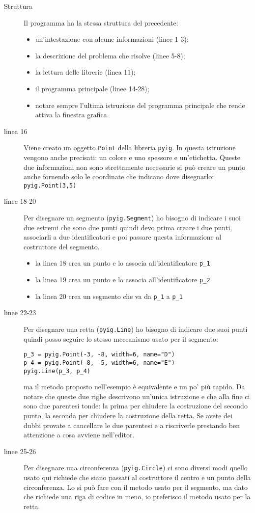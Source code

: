 \begin{description}
 \item [Struttura] 
 Il programma ha la stessa struttura del precedente:
\begin{itemize} [nosep]
 \item un'intestazione con alcune informazioni (linee 1-3); 
 \item la descrizione del problema che risolve (linee 5-8);
 \item la lettura delle librerie (linea 11);
 \item il programma principale (linee 14-28);
 \item notare sempre l'ultima istruzione del programma principale che rende 
attiva la finestra grafica.
\end{itemize}
 \item [linea 16]
 Viene creato un oggetto \lstinline{Point} della libreria \lstinline{pyig}. 
In questa istruzione vengono anche precisati: un colore e uno spessore e 
un'etichetta.
Queste due informazioni non sono strettamente necessarie si può creare un punto 
anche fornendo solo le coordinate che indicano dove disegnarlo:
\lstinline{pyig.Point(3,5)}
 \item [linee 18-20]
 Per disegnare un segmento (\lstinline{pyig.Segment}) ho bisogno di indicare i 
suoi due estremi che sono due punti quindi devo prima creare i due punti, 
associarli a due identificatori e poi passare questa informazione al 
costruttore 
del segmento. 
\begin{itemize} [nosep]
 \item la linea 18 crea un punto e lo associa all'identificatore 
 \lstinline{p_1}
 \item la linea 19 crea un punto e lo associa all'identificatore 
 \lstinline{p_2}
 \item la linea 20 crea un segmento che va da 
 \lstinline{p_1} a \lstinline{p_1}
\end{itemize}
 \item [linee 22-23]
 Per disegnare una retta (\lstinline{pyig.Line}) ho bisogno di indicare due suoi
punti quindi posso seguire lo stesso meccanismo usato per il segmento:
\begin{lstlisting}[numbers=none]
p_3 = pyig.Point(-3, -8, width=6, name="D")
p_4 = pyig.Point(-8, -5, width=6, name="E")
pyig.Line(p_3, p_4)
\end{lstlisting}
ma il metodo proposto nell'esempio è equivalente e un po' più rapido.
Da notare che queste due righe descrivono un'unica istruzione e che alla fine 
ci sono due parentesi tonde: la prima per chiudere la costruzione del secondo 
punto, la seconda per chiudere la costruzione della retta.
Se avete dei dubbi provate a cancellare le due parentesi e a riscriverle 
prestando ben attenzione a cosa avviene nell'editor.
 \item [linee 25-26]
 Per disegnare una circonferenza (\lstinline{pyig.Circle}) ci sono diversi modi 
quello usato qui richiede che siano passati al costruttore il centro e un punto 
della circonferenza. Lo si può fare con il metodo usato per il segmento, ma 
dato che richiede una riga di codice in meno, io preferisco il metodo usato per 
la retta.
\end{description}

